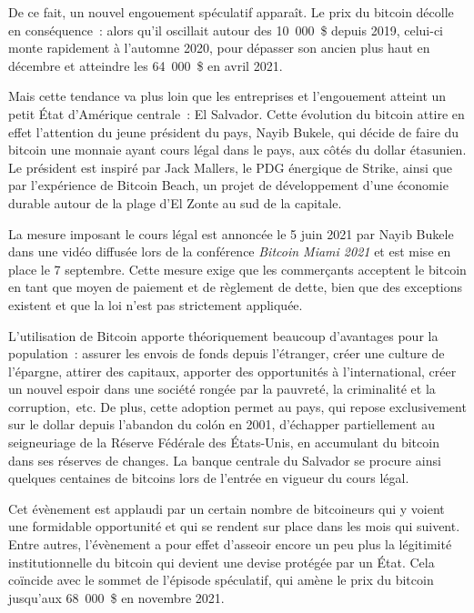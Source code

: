De ce fait, un nouvel engouement spéculatif apparaît. Le prix du bitcoin décolle en conséquence~: alors qu'il oscillait autour des 10~000~\$ depuis 2019, celui-ci monte rapidement à l'automne 2020, pour dépasser son ancien plus haut en décembre et atteindre les 64~000~\$ en avril 2021. 

Mais cette tendance va plus loin que les entreprises et l'engouement atteint un petit État d'Amérique centrale~: El Salvador. Cette évolution du bitcoin attire en effet l'attention du jeune président du pays, Nayib Bukele, qui décide de faire du bitcoin une monnaie ayant cours légal dans le pays, aux côtés du dollar étasunien. Le président est inspiré par Jack Mallers, le PDG énergique de Strike, ainsi que par l'expérience de Bitcoin Beach, un projet de développement d'une économie durable autour de la plage d'El Zonte au sud de la capitale.

La mesure imposant le cours légal est annoncée le 5 juin 2021 par Nayib Bukele dans une vidéo diffusée lors de la conférence \emph{Bitcoin Miami 2021} et est mise en place le 7 septembre. Cette mesure exige que les commerçants acceptent le bitcoin en tant que moyen de paiement et de règlement de dette, bien que des exceptions existent et que la loi n'est pas strictement appliquée.

L'utilisation de Bitcoin apporte théoriquement beaucoup d'avantages pour la population~: assurer les envois de fonds depuis l'étranger, créer une culture de l'épargne, attirer des capitaux, apporter des opportunités à l'international, créer un nouvel espoir dans une société rongée par la pauvreté, la criminalité et la corruption,~etc. De plus, cette adoption permet au pays, qui repose exclusivement sur le dollar depuis l'abandon du colón en 2001, d'échapper partiellement au seigneuriage de la Réserve Fédérale des États-Unis, en accumulant du bitcoin dans ses réserves de changes. La banque centrale du Salvador se procure ainsi quelques centaines de bitcoins lors de l'entrée en vigueur du cours légal.

Cet évènement est applaudi par un certain nombre de bitcoineurs qui y voient une formidable opportunité et qui se rendent sur place dans les mois qui suivent. Entre autres, l'évènement a pour effet d'asseoir encore un peu plus la légitimité institutionnelle du bitcoin qui devient une devise protégée par un État. Cela coïncide avec le sommet de l'épisode spéculatif, qui amène le prix du bitcoin jusqu'aux 68~000~\$ en novembre 2021.

